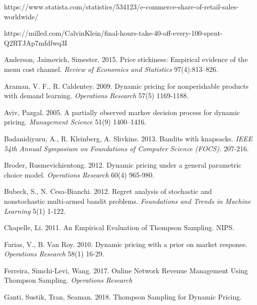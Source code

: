 \documentclass[a4paper]{article}
\begin{document}
\begin{thebibliography}{9}
	https://www.statista.com/statistics/534123/e-commerce-share-of-retail-sales-worldwide/
	
	https://milled.com/CalvinKlein/final-hours-take-40-off-every-100-spent-Q2RTJAp7mfdfwq3I
	
	Anderson, Jaimovich, Simester. 2015. Price stickiness: Empirical evidence of the menu cost channel. \emph{Review of Economics and Statistics} 97(4):813–826.
	
	Araman, V. F., R. Caldentey. 2009. Dynamic pricing for nonperishable products with demand learning.
	\emph{Operations Research} 57(5) 1169-1188.
	
	Aviv, Pazgal. 2005. A partially observed markov decision process for dynamic
	pricing. \emph{Management Science} 51(9) 1400–1416.
	
	Badanidiyuru, A., R. Kleinberg, A. Slivkins. 2013. Bandits with knapsacks. \emph{IEEE 54th Annual Symposium on Foundations of Computer Science (FOCS).} 207-216.	
	
	Broder, Rusmevichientong. 2012. Dynamic pricing under a general parametric choice model. \emph{Operations Research} 60(4) 965-980.
	
	Bubeck, S., N. Cesa-Bianchi. 2012. Regret analysis of stochastic and nonstochastic multi-armed bandit problems. \emph{Foundations and Trends in Machine Learning} 5(1) 1-122.
	
	Chapelle,  Li. 2011. An Empirical Evaluation of Thompson Sampling. NIPS. 
	
	Farias, V., B. Van Roy. 2010. Dynamic pricing with a prior on market response. \emph{Operations Research} 58(1) 16-29.
	
	Ferreira, Simchi-Levi, Wang. 2017. Online Network Revenue Management Using Thompson Sampling. \emph{Operations Research}
	
	Ganti, Sustik, Tran, Seaman. 2018. Thompson Sampling for Dynamic Pricing. 
\end{thebibliography}
\end{document}
